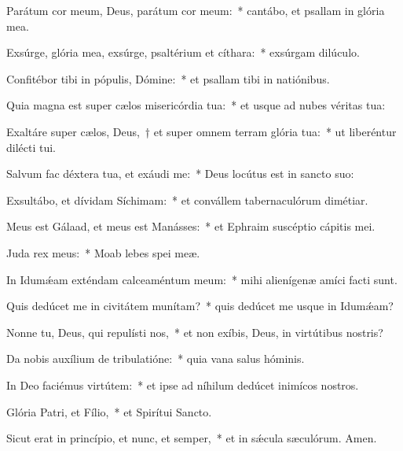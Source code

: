 \item Parátum cor meum, Deus, parátum cor meum:~* cantábo, et psallam in glória mea.

\item Exsúrge, glória mea, exsúrge, psaltérium et cíthara:~* exsúrgam dilúculo.

\item Confitébor tibi in pópulis, Dómine:~* et psallam tibi in natiónibus.

\item Quia magna est super cælos misericórdia tua:~* et usque ad nubes véritas tua:

\item Exaltáre super cælos, Deus,~† et super omnem terram glória tua:~* ut liberéntur dilécti tui.

\item Salvum fac déxtera tua, et exáudi me:~* Deus locútus est in sancto suo:

\item Exsultábo, et dívidam Síchimam:~* et convállem tabernaculórum dimétiar.

\item Meus est Gálaad, et meus est Manásses:~* et Ephraim suscéptio cápitis mei.

\item Juda rex meus:~* Moab lebes spei meæ.

\item In Idumǽam exténdam calceaméntum meum:~* mihi alienígenæ amíci facti sunt.

\item Quis dedúcet me in civitátem munítam?~* quis dedúcet me usque in Idumǽam?

\item Nonne tu, Deus, qui repulísti nos,~* et non exíbis, Deus, in virtútibus nostris?

\item Da nobis auxílium de tribulatióne:~* quia vana salus hóminis.

\item In Deo faciémus virtútem:~* et ipse ad níhilum dedúcet inimícos nostros.

\item Glória Patri, et Fílio,~* et Spirítui Sancto.

\item Sicut erat in princípio, et nunc, et semper,~* et in sǽcula sæculórum. Amen.

